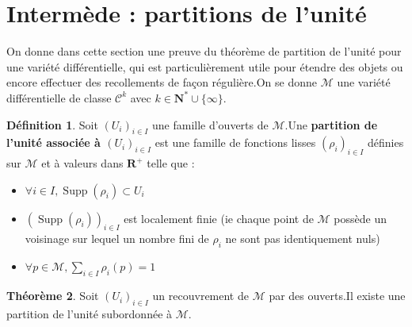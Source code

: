 \documentclass[12pt,a4paper]{article}
\DeclareMathOperator{\Supp}{Supp}
\theoremstyle{definition}
\newtheorem{thm}{Théorème}
\newtheorem{defn}[thm]{Définition}
\begin{document}
\section{Intermède : partitions de l'unité}
On donne dans cette section une preuve du théorème de partition de l'unité pour une variété différentielle, qui est particulièrement utile pour étendre des objets ou encore effectuer des recollements de façon régulière.\newline On se donne $\mathcal{M}$ une variété différentielle de classe $\mathcal{C}^k$ avec $k\in\mathbf{N}^*\cup\{\infty\}$.
\begin{defn}
Soit $(U_i)_{i\in I}$ une famille d'ouverts de $\mathcal{M}$.\newline Une \textbf{partition de l'unité associée à $(U_i)_{i\in I}$} est une famille de fonctions lisses $(\rho_i)_{i\in I}$ définies sur $\mathcal{M}$ et à valeurs dans $\mathbf{R}^+$ telle que :
\begin{itemize}
\item $\forall i\in I, \Supp(\rho_i)\subset U_i$
\item $(\Supp(\rho_i))_{i\in I}$ est localement finie (ie chaque point de $\mathcal{M}$ possède un voisinage sur lequel un nombre fini de $\rho_i$ ne sont pas identiquement nuls)
\item $\displaystyle\forall p\in\mathcal{M}, \sum\limits_{i\in I}\rho_i(p)=1$
\end{itemize}
\end{defn}
\begin{thm}
Soit $(U_i)_{i\in I}$ un recouvrement de $\mathcal{M}$ par des ouverts.\newline Il existe une partition de l'unité subordonnée à $\mathcal{M}$.
\end{thm}
\end{document}

